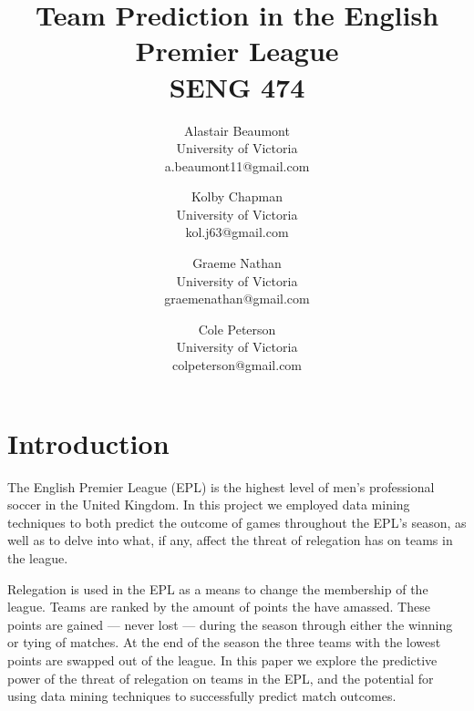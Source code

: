 \documentclass[conference]{IEEEtran}
\begin{document}
%
	
\title{Team Prediction in the English Premier League\\ {\large SENG 474}}

\author{%
  Alastair Beaumont\\University of Victoria\\a.beaumont11@gmail.com
  \and Kolby Chapman\\University of Victoria\\kol.j63@gmail.com
  \and Graeme Nathan\\University of Victoria\\graemenathan@gmail.com
  \and Cole Peterson\\University of Victoria\\colpeterson@gmail.com
}

\maketitle

\IEEEpeerreviewmaketitle

\section{Introduction}
The English Premier League (EPL) is the highest level of men’s professional soccer in the United Kingdom. In this project we employed data mining techniques to both predict the outcome of games throughout the EPL’s season, as well as to delve into what, if any, affect the threat of relegation has on teams in the league.

Relegation is used in the EPL as a means to change the membership of the league. Teams are ranked by the amount of points the have amassed. These points are gained — never lost — during the season through either the winning or tying of matches. At the end of the season the three teams with the lowest points are swapped out of the league.  
In this paper we explore the predictive power of the threat of relegation on teams in the EPL, and the potential for using data mining techniques to successfully predict match outcomes.
\end{document}
